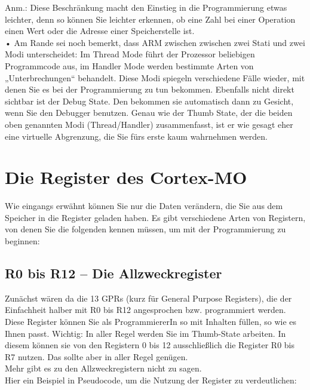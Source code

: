 Anm.: Diese Beschränkung macht den Einstieg in die Programmierung etwas leichter, denn so können Sie leichter erkennen, ob eine Zahl bei einer Operation einen Wert oder die Adresse einer Speicherstelle ist.\\

•	Am Rande sei noch bemerkt, dass ARM zwischen zwischen zwei Stati und zwei Modi unterscheidet: Im Thread Mode führt der Prozessor beliebigen Programmcode aus, im Handler Mode werden bestimmte Arten von „Unterbrechungen“ behandelt. Diese Modi spiegeln verschiedene Fälle wieder, mit denen Sie es bei der Programmierung zu tun bekommen. Ebenfalls nicht direkt sichtbar ist der Debug State. Den bekommen sie automatisch dann zu Gesicht, wenn Sie den Debugger benutzen. Genau wie der Thumb State, der die beiden oben genannten Modi (Thread/Handler) zusammenfasst, ist er wie gesagt eher eine virtuelle Abgrenzung, die Sie fürs erste kaum wahrnehmen werden.\\

\section{Die Register des Cortex-MO}

Wie eingangs erwähnt können Sie nur die Daten verändern, die Sie aus dem Speicher in die Register geladen haben. Es gibt verschiedene Arten von Registern, von denen Sie die folgenden kennen müssen, um mit der Programmierung zu beginnen:

\subsection{R0 bis R12 – Die Allzweckregister}

Zunächst wären da die 13 GPRs (kurz für General Purpose Registers), die der Einfachheit halber mit R0 bis R12 angesprochen bzw. programmiert werden. Diese Register können Sie als ProgrammiererIn so mit Inhalten füllen, so wie es Ihnen passt. Wichtig: In aller Regel werden Sie im Thumb-State arbeiten. In diesem können sie von den Registern 0 bis 12 ausschließlich die Register R0 bis R7 nutzen. Das sollte aber in aller Regel genügen.\\

Mehr gibt es zu den Allzweckregistern nicht zu sagen.\\

Hier ein Beispiel in Pseudocode, um die Nutzung der Register zu verdeutlichen:\\

